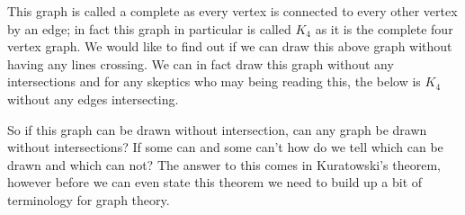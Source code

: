 \documentclass{article}
\begin{document}
\begin{center}
\end{center}

This \gls{graph} is called a \gls{complete} as every \gls{vertex} is connected to every other \gls{vertex} by an \gls{edge}; in fact this \gls{graph} in particular is called $K_4$ as it is the complete four vertex \gls{graph}. We would like to find out if we can draw this above \gls{graph} without having any lines crossing. We can in fact draw this \gls{graph} without any intersections and for any skeptics who may being reading this, the below is $K_4$ without any \glspl{edge} intersecting.

\begin{center}
\end{center}

So if this \gls{graph} can be drawn without intersection, can any \gls{graph} be drawn without intersections? If some can and some can't how do we tell which can be drawn and which can not? The answer to this comes in Kuratowski's theorem, however before we can even state this theorem we need to build up a bit of terminology for graph theory.
\end{document}
